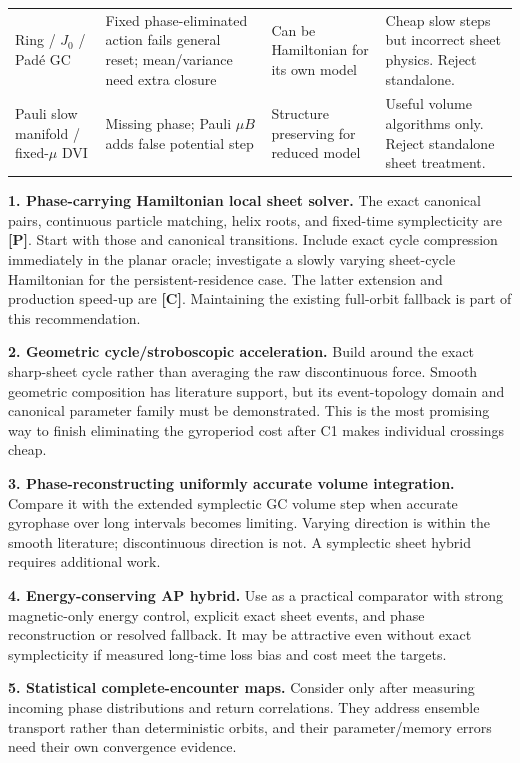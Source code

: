 \documentclass[10pt,a4paper]{article}
\newcommand{\proved}{\textbf{[P]}}
\newcommand{\conj}{\textbf{[C]}}
\begin{document}
\begin{longtable}{p{.20\linewidth}p{.25\linewidth}p{.22\linewidth}p{.22\linewidth}}
Ring / $J_0$ / Pad\'e GC & Fixed phase-eliminated action fails general reset; mean/variance need extra closure & Can be Hamiltonian for its own model & Cheap slow steps but incorrect sheet physics. Reject standalone.\\
Pauli slow manifold / fixed-$\mu$ DVI & Missing phase; Pauli $\mu B$ adds false potential step & Structure preserving for reduced model & Useful volume algorithms only. Reject standalone sheet treatment.\\
\bottomrule
\end{longtable}

\textbf{1. Phase-carrying Hamiltonian local sheet solver.} The exact canonical pairs, continuous particle matching, helix roots, and fixed-time symplecticity are \proved{}. Start with those and canonical transitions. Include exact cycle compression immediately in the planar oracle; investigate a slowly varying sheet-cycle Hamiltonian for the persistent-residence case. The latter extension and production speed-up are \conj{}. Maintaining the existing full-orbit fallback is part of this recommendation.

\textbf{2. Geometric cycle/stroboscopic acceleration.} Build around the exact sharp-sheet cycle rather than averaging the raw discontinuous force. Smooth geometric composition has literature support, but its event-topology domain and canonical parameter family must be demonstrated. This is the most promising way to finish eliminating the gyroperiod cost after C1 makes individual crossings cheap.

\textbf{3. Phase-reconstructing uniformly accurate volume integration.} Compare it with the extended symplectic GC volume step when accurate gyrophase over long intervals becomes limiting. Varying direction is within the smooth literature; discontinuous direction is not. A symplectic sheet hybrid requires additional work.

\textbf{4. Energy-conserving AP hybrid.} Use as a practical comparator with strong magnetic-only energy control, explicit exact sheet events, and phase reconstruction or resolved fallback. It may be attractive even without exact symplecticity if measured long-time loss bias and cost meet the targets.

\textbf{5. Statistical complete-encounter maps.} Consider only after measuring incoming phase distributions and return correlations. They address ensemble transport rather than deterministic orbits, and their parameter/memory errors need their own convergence evidence.
\end{document}
